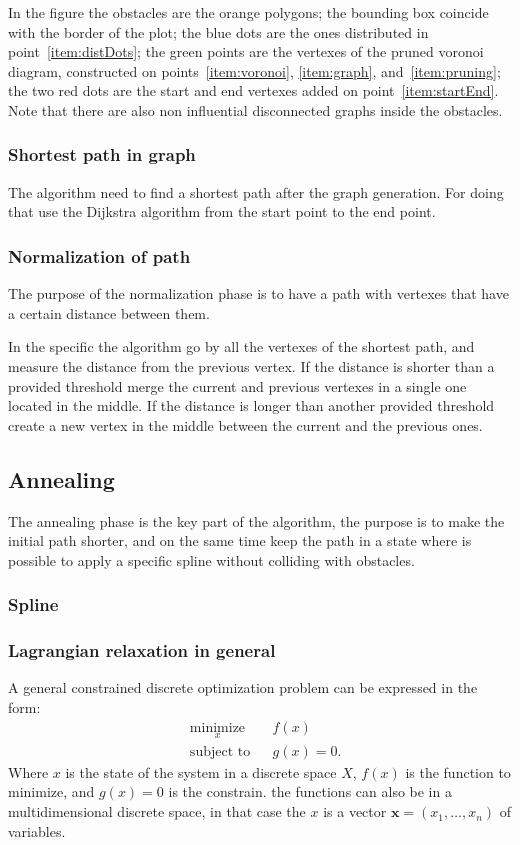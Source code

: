 \documentclass[a4paper]{article}
\begin{document}
In the figure the obstacles are the orange polygons; the bounding box
coincide with the border of the plot; the blue dots are the ones
distributed in point~\ref{item:distDots}; the green points are the
vertexes of the pruned voronoi diagram, constructed on
points~\ref{item:voronoi}, \ref{item:graph}, and~\ref{item:pruning};
the two red dots are the start and end vertexes added on point~\ref{item:startEnd}.
Note that there are also non influential disconnected graphs inside
the obstacles.

\subsubsection{Shortest path in graph}
The algorithm need to find a shortest path after the graph
generation. For doing that use the Dijkstra algorithm from the start
point to the end point.

\subsubsection{Normalization of path}
The purpose of the normalization phase is to have a path with vertexes
that have a certain distance between them.

In the specific the
algorithm go by all the vertexes of the shortest path, and measure the
distance from the previous vertex. If the distance is shorter than a
provided threshold merge the current and previous vertexes in
a single one located in the middle. If the distance is longer than
another provided threshold create a new vertex in the middle between
the current and the previous ones.

\subsection{Annealing}
The annealing phase is the key part of the algorithm, the purpose is
to make the initial path shorter, and on the same time keep the path
in a state where is possible to apply a specific spline without
colliding with obstacles.

\subsubsection{Spline}\label{sec:spline}

\subsubsection{Lagrangian relaxation in general}
A general constrained discrete optimization problem can be expressed in
the form:
\begin{equation}\label{eq:opt}
\begin{aligned}
& \underset{x}{\text{minimize}}
& & f(x) \\
& \text{subject to}
& & g(x)=0.
\end{aligned}
\end{equation}
Where $x$ is the state of the system in a discrete space $X$, $f(x)$
is the function to
minimize, and $g(x)=0$ is the constrain. the functions can also be
in a multidimensional discrete space, in that case the $x$ is a vector
$\mathbf{x}=(x_1,\dots,x_n)$ of variables.
\end{document}
